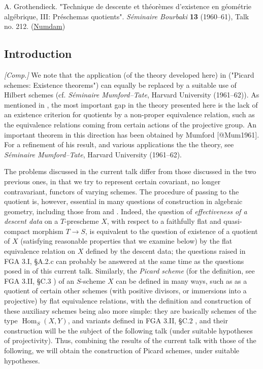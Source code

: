
A. Grothendieck.
"Technique de descente et théorèmes d'existence en géométrie algébrique, III: Préschemas quotients".
\emph{Séminaire Bourbaki} \textbf{13} (1960–61), Talk no. 212.
(\href{http://www.numdam.org/book-part/SB_1960-1961__6__99_0/}{Numdam})

\subsection*{Introduction}\label{fga3.iii-introduction}

\begin{remark}\label{fga3.iii-introduction-remark}
    \emph{[Comp.]}
    We note that the application (of the theory developed here) in  ("Picard schemes: Existence theorems") can equally be replaced by a suitable use of Hilbert schemes (cf. \emph{Séminaire Mumford–Tate}, Harvard University (1961–62)).
    As mentioned in , the most important gap in the theory presented here is the lack of an existence criterion for quotients by a non-proper equivalence relation, such as the equivalence relations coming from certain actions of the projective group.
    An important theorem in this direction has been obtained by Mumford [@Mum1961].
    For a refinement of his result, and various applications the the theory, see \emph{Séminaire Mumford–Tate}, Harvard University (1961–62).
\end{remark}


The problems discussed in the current talk differ from those discussed in the two previous ones, in that we try to represent certain covariant, no longer contravariant, functors of varying schemes.
The procedure of passing to the quotient is, however, essential in many questions of construction in algebraic geometry, including those from  and .
Indeed, the question of \emph{effectiveness of a descent data} on a $T$-prescheme $X$, with respect to a faithfully flat and quasi-compact morphism $T\to S$, is equivalent to the question of existence of a quotient of $X$ (satisfying reasonable properties that we examine below) by the flat equivalence relation on $X$ defined by the descent data;
the questions raised in FGA 3.I, §A.2.c  can probably be answered at the same time as the questions posed in  of this current talk.
Similarly, the \emph{Picard scheme} (for the definition, see FGA 3.II, §C.3 ) of an $S$-scheme $X$ can be defined in many ways, such as as a quotient of certain other schemes (with positive divisors, or immersions into a projective) by flat equivalence relations, with the definition and construction of these auxiliary schemes being also more simple: they are basically schemes of the type $\operatorname{Hom}_S(X,Y)$, and variants defined in FGA 3.II, §C.2 , and their construction will be the subject of the following talk (under suitable hypotheses of projectivity).
Thus, combining the results of the current talk with those of the following, we will obtain the construction of Picard schemes, under suitable hypotheses.

